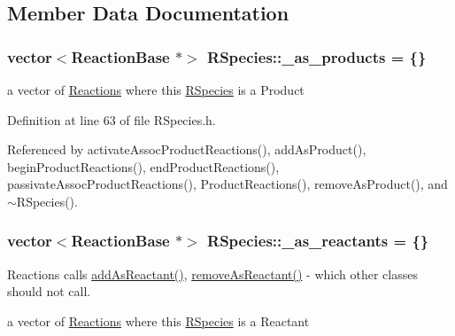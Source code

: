 \subsection{Member Data Documentation}
\hypertarget{classRSpecies_a166eef547a69e4c03f5a8390b5f0686b}{
\subsubsection[{\+\_\+as\+\_\+products}]{\setlength{\rightskip}{0pt plus 5cm}vector$<${\bf Reaction\+Base} $\ast$$>$ R\+Species\+::\+\_\+as\+\_\+products = \{\}\hspace{0.3cm}{\ttfamily [private]}}}\label{classRSpecies_a166eef547a69e4c03f5a8390b5f0686b}


a vector of \hyperlink{classReaction}{Reactions} where this \hyperlink{classRSpecies}{R\+Species} is a Product 



Definition at line 63 of file R\+Species.\+h.



Referenced by activate\+Assoc\+Product\+Reactions(), add\+As\+Product(), begin\+Product\+Reactions(), end\+Product\+Reactions(), passivate\+Assoc\+Product\+Reactions(), Product\+Reactions(), remove\+As\+Product(), and $\sim$\+R\+Species().

\hypertarget{classRSpecies_a231c4835e7367ffdb405a1463a7f8170}{
\subsubsection[{\+\_\+as\+\_\+reactants}]{\setlength{\rightskip}{0pt plus 5cm}vector$<${\bf Reaction\+Base} $\ast$$>$ R\+Species\+::\+\_\+as\+\_\+reactants = \{\}\hspace{0.3cm}{\ttfamily [private]}}}\label{classRSpecies_a231c4835e7367ffdb405a1463a7f8170}


Reactions calls \hyperlink{classRSpecies_a6e52bc2409c55b706197b2e48323aff2}{add\+As\+Reactant()}, \hyperlink{classRSpecies_a3abaae1f77fc3cd47eb77926b7f26828}{remove\+As\+Reactant()} -\/ which other classes should not call. 

a vector of \hyperlink{classReaction}{Reactions} where this \hyperlink{classRSpecies}{R\+Species} is a Reactant 

